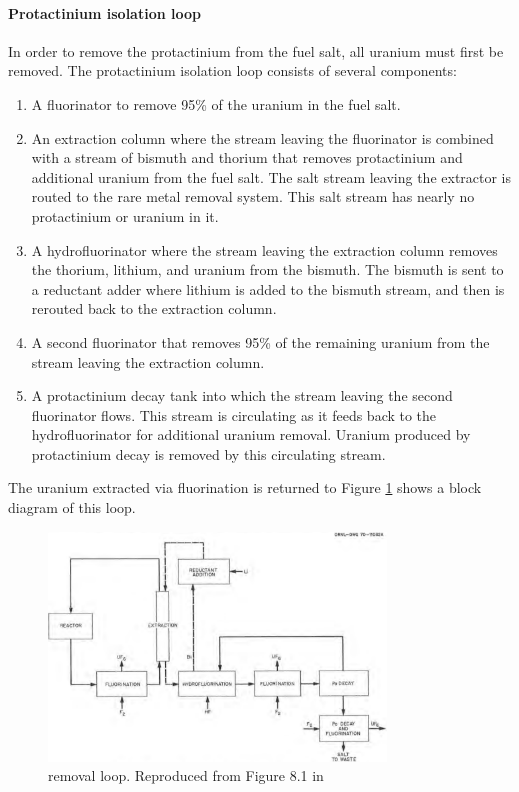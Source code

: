 \paragraph{Protactinium isolation loop}
In order to remove the protactinium from the fuel salt, all uranium must first be removed. The protactinium isolation loop consists of several components: 
\begin{enumerate}
    \item A fluorinator to remove 95\% of the uranium in the fuel salt.
    \item An extraction column where the stream leaving the fluorinator is combined with a stream of bismuth and thorium that removes protactinium and additional uranium from the fuel salt. The salt stream leaving the extractor is routed to the rare metal removal system. This salt stream has nearly no protactinium or uranium in it.
    \item A hydrofluorinator where the stream leaving the extraction column removes the thorium, lithium, and uranium from the bismuth. The bismuth is sent to a reductant adder where lithium is added to the bismuth stream, and then is rerouted back to the extraction column.
    \item A second fluorinator that removes 95\% of the remaining uranium from the stream leaving the extraction column.
    \item A protactinium decay tank into which the stream leaving the second fluorinator flows. This stream is circulating as it feeds back to the hydrofluorinator for additional uranium removal. Uranium produced by protactinium decay is removed by this circulating stream.
\end{enumerate}

The uranium extracted via fluorination is returned to 
Figure \ref{fig:pa-removal} shows a block diagram of this loop. 

\begin{figure}[htpb]
    \centering
    \includegraphics[width=0.8\textwidth]{figs/ch4/pa_removal_loop.png}
    \caption{ removal loop. Reproduced from Figure 8.1 in \cite{robertson_conceptual_1971}}
    \label{fig:pa-removal}
\end{figure}

